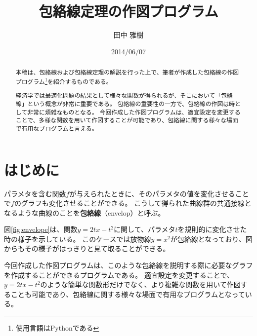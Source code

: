 \documentclass[11pt,a4j]{jarticle}
\title{包絡線定理の作図プログラム}
\author{田中 雅樹}
\date{2014/06/07}
\begin{document}
\maketitle

\begin{abstract}
本稿は、包絡線および包絡線定理の解説を行った上で、筆者が作成した包絡線の作図プログラム\footnote{使用言語はPythonである}を紹介するものである。

経済学では最適化問題の結果として様々な関数が得られるが、そこにおいて「包絡線」という概念が非常に重要である。
包絡線の重要性の一方で、包絡線の作図は時として非常に煩雑なものとなる。
今回作成した作図プログラムは、適宜設定を変更することで、多様な関数を用いて作図することが可能であり、包絡線に関する様々な場面で有用なプログラムと言える。
\end{abstract}

\section{はじめに}
パラメタを含む関数$f$が与えられたときに、そのパラメタの値を変化させることで$f$のグラフも変化させることができる。
こうして得られた曲線群の共通接線となるような曲線のことを\textbf{包絡線}（envelop）と呼ぶ。

図\ref{fig:envelope}は、関数$y=2tx-t^{2}$に関して、パラメタ$t$を規則的に変化させた時の様子を示している。
このケースでは放物線$y=x^{2}$が包絡線となっており、図からもその様子がはっきりと見て取ることができる。

今回作成した作図プログラムは、このような包絡線を説明する際に必要なグラフを作成することができるプログラムである。
適宜設定を変更することで、$y=2tx-t^{2}$のような簡単な関数形だけでなく、より複雑な関数を用いて作図することも可能であり、包絡線に関する様々な場面で有用なプログラムとなっている。
\end{document}
